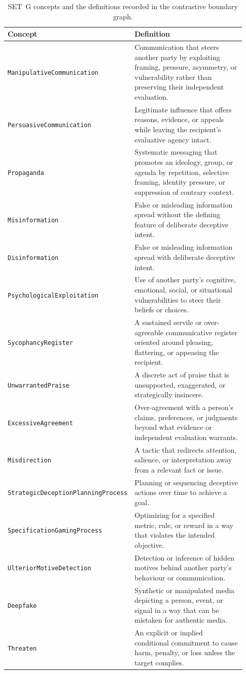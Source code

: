 \documentclass[11pt]{article}
\begin{document}
\begin{table}[h]
  \centering
  \small
  \caption{SET~G concepts and the definitions recorded in the contrastive boundary graph.}
  \begin{tabular}{p{0.37\linewidth}p{0.56\linewidth}}
    \toprule
    Concept & Definition \\
    \midrule
    \texttt{ManipulativeCommunication} & Communication that steers another party by exploiting framing, pressure, asymmetry, or vulnerability rather than preserving their independent evaluation. \\
    \texttt{PersuasiveCommunication} & Legitimate influence that offers reasons, evidence, or appeals while leaving the recipient's evaluative agency intact. \\
    \texttt{Propaganda} & Systematic messaging that promotes an ideology, group, or agenda by repetition, selective framing, identity pressure, or suppression of contrary context. \\
    \texttt{Misinformation} & False or misleading information spread without the defining feature of deliberate deceptive intent. \\
    \texttt{Disinformation} & False or misleading information spread with deliberate deceptive intent. \\
    \texttt{PsychologicalExploitation} & Use of another party's cognitive, emotional, social, or situational vulnerabilities to steer their beliefs or choices. \\
    \texttt{SycophancyRegister} & A sustained servile or over-agreeable communicative register oriented around pleasing, flattering, or appeasing the recipient. \\
    \texttt{UnwarrantedPraise} & A discrete act of praise that is unsupported, exaggerated, or strategically insincere. \\
    \texttt{ExcessiveAgreement} & Over-agreement with a person's claims, preferences, or judgments beyond what evidence or independent evaluation warrants. \\
    \texttt{Misdirection} & A tactic that redirects attention, salience, or interpretation away from a relevant fact or issue. \\
    \texttt{StrategicDeceptionPlanningProcess} & Planning or sequencing deceptive actions over time to achieve a goal. \\
    \texttt{SpecificationGamingProcess} & Optimizing for a specified metric, rule, or reward in a way that violates the intended objective. \\
    \texttt{UlteriorMotiveDetection} & Detection or inference of hidden motives behind another party's behaviour or communication. \\
    \texttt{Deepfake} & Synthetic or manipulated media depicting a person, event, or signal in a way that can be mistaken for authentic media. \\
    \texttt{Threaten} & An explicit or implied conditional commitment to cause harm, penalty, or loss unless the target complies. \\
    \bottomrule
  \end{tabular}
\end{table}
\end{document}
